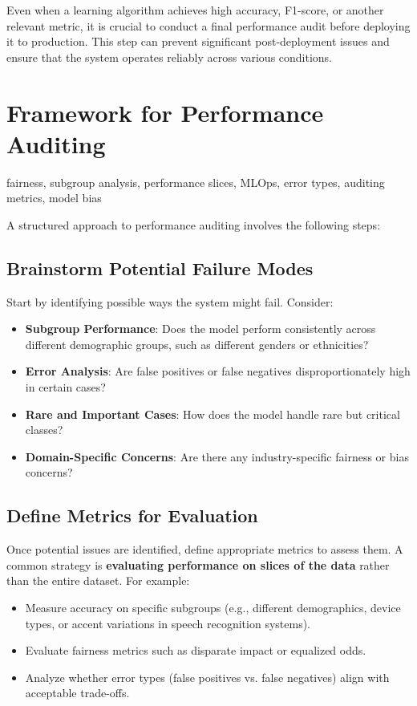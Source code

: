 \documentclass[12pt,openany, draft]{book}
\begin{document}
Even when a learning algorithm achieves high accuracy, F1-score, or another relevant metric, it is crucial to conduct a final performance audit before deploying it to production. This step can prevent significant post-deployment issues and ensure that the system operates reliably across various conditions. 



\section{Framework for Performance Auditing}

\begin{keywordsbox}
fairness, subgroup analysis, performance slices, MLOps, error types, auditing metrics, model bias
\end{keywordsbox}

A structured approach to performance auditing involves the following steps:

\subsection{Brainstorm Potential Failure Modes}
Start by identifying possible ways the system might fail. Consider:
\begin{itemize}
    \item \textbf{Subgroup Performance}: Does the model perform consistently across different demographic groups, such as different genders or ethnicities?
    \item \textbf{Error Analysis}: Are false positives or false negatives disproportionately high in certain cases?
    \item \textbf{Rare and Important Cases}: How does the model handle rare but critical classes?
    \item \textbf{Domain-Specific Concerns}: Are there any industry-specific fairness or bias concerns?
\end{itemize}

\subsection{Define Metrics for Evaluation}
Once potential issues are identified, define appropriate metrics to assess them. A common strategy is \textbf{evaluating performance on slices of the data} rather than the entire dataset. For example:
\begin{itemize}
    \item Measure accuracy on specific subgroups (e.g., different demographics, device types, or accent variations in speech recognition systems).
    \item Evaluate fairness metrics such as disparate impact or equalized odds.
    \item Analyze whether error types (false positives vs. false negatives) align with acceptable trade-offs.
\end{itemize}
\end{document}
